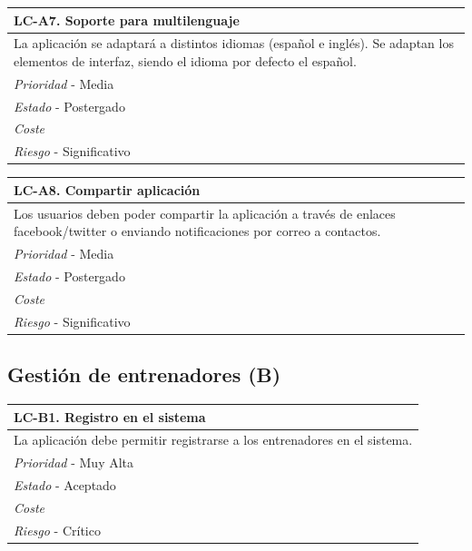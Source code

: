	\begin{center}
		\begin{tabularx}{15cm}{|X|}
			\hline 
				\bf{LC-A7. Soporte para multilenguaje}\\
			\hline
				La aplicación se adaptará a distintos idiomas (español e inglés). Se adaptan los elementos de interfaz, siendo el idioma por defecto el español.\\
			\hline
				{\it Prioridad} - Media\\
			\hline
				{\it Estado} - Postergado\\
			\hline
				{\it Coste}\\
			\hline
				{\it Riesgo} - Significativo\\
			\hline
		\end{tabularx}
	\end{center}
	
	\begin{center}
		\begin{tabularx}{15cm}{|X|}
			\hline 
				\bf{LC-A8. Compartir aplicación}\\
			\hline
				Los usuarios deben poder compartir la aplicación a través de enlaces facebook/twitter o enviando notificaciones por correo a contactos.\\
			\hline
				{\it Prioridad} - Media\\
			\hline
				{\it Estado} - Postergado\\
			\hline
				{\it Coste}\\
			\hline
				{\it Riesgo} - Significativo\\
			\hline
		\end{tabularx}
	\end{center}
	

% 
%
\subsection{Gestión de entrenadores (B)} %
	\label{sub:gestion_de_entrenadores}
	
	\begin{center}
		\begin{tabularx}{15cm}{|X|}
			\hline 
				\bf{LC-B1. Registro en el sistema}\\
			\hline
				La aplicación debe permitir registrarse a los entrenadores en el sistema.\\
			\hline
				{\it Prioridad} - Muy Alta\\
			\hline
				{\it Estado} - Aceptado \\
			\hline
				{\it Coste}\\
			\hline
				{\it Riesgo} - Crítico\\
			\hline
		\end{tabularx}
	\end{center}
	
